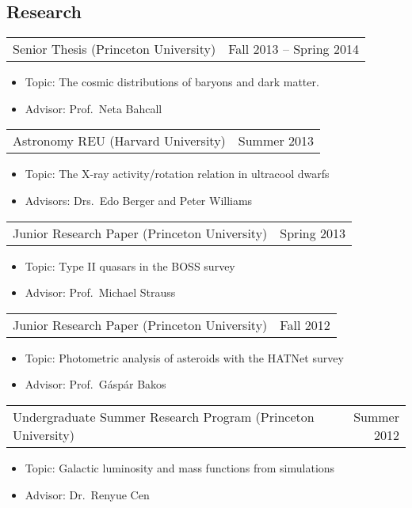 \documentclass[margin]{res}
\begin{document}
\begin{resume}
\normalsize{\section{Research}}
\begin{tabular}{@{}p{4in} r}
  Senior Thesis (Princeton University) & Fall 2013 -- Spring 2014
\end{tabular}
\begin{itemize} \itemsep -2pt
\item[] Topic: The cosmic distributions of baryons and dark matter.
\item[] Advisor: Prof.~Neta Bahcall
\end{itemize}
\begin{tabular}{@{}p{4in} r}
  Astronomy REU (Harvard University) & Summer 2013
\end{tabular}
\begin{itemize} \itemsep -2pt
\item[] Topic: The X-ray activity/rotation relation in ultracool
  dwarfs
\item[] Advisors: Drs.~Edo Berger and Peter Williams
\end{itemize}
\begin{tabular}{@{}p{4in} r}
  Junior Research Paper (Princeton University) & Spring 2013
\end{tabular}
\begin{itemize} \itemsep -2pt
\item[] Topic: Type II quasars in the BOSS survey
\item[] Advisor: Prof.~Michael Strauss
\end{itemize}
\begin{tabular}{@{}p{4in} r}
  Junior Research Paper (Princeton University) & Fall 2012
\end{tabular}
\begin{itemize} \itemsep -2pt
\item[] Topic: Photometric analysis of asteroids with the HATNet
  survey
\item[] Advisor: Prof.~G\'asp\'ar Bakos
\end{itemize}
\begin{tabular}{@{}p{4in} r}
  Undergraduate Summer Research Program (Princeton University) &
  Summer 2012
\end{tabular}
\begin{itemize} \itemsep -2pt
\item[] Topic: Galactic luminosity and mass functions from simulations
\item[] Advisor: Dr.~Renyue Cen
\end{itemize}


\end{resume}
\end{document}
